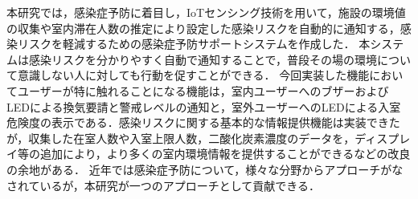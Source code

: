 
本研究では，感染症予防に着目し，IoTセンシング技術を用いて，施設の環境値の収集や室内滞在人数の推定により設定した感染リスクを自動的に通知する，感染リスクを軽減するための感染症予防サポートシステムを作成した．
本システムは感染リスクを分かりやすく自動で通知することで，普段その場の環境について意識しない人に対しても行動を促すことができる．
今回実装した機能においてユーザーが特に触れることになる機能は，室内ユーザーへのブザーおよびLEDによる換気要請と警戒レベルの通知と，室外ユーザーへのLEDによる入室危険度の表示である．感染リスクに関する基本的な情報提供機能は実装できたが，収集した在室人数や入室上限人数，二酸化炭素濃度のデータを，ディスプレイ等の追加により，より多くの室内環境情報を提供することができるなどの改良の余地がある．
近年では感染症予防について，様々な分野からアプローチがなされているが，本研究が一つのアプローチとして貢献できる．